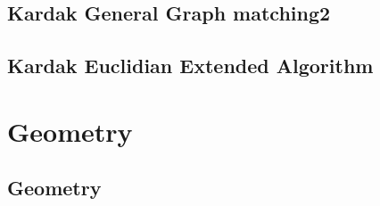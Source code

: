 \documentclass[a4paper,landscape]{article}
\begin{document}
\begin{multicols}{2}
\subsection{Kardak General Graph matching2}
	
\subsection{Kardak Euclidian Extended Algorithm}
	

\section{Geometry}
\subsection{Geometry}
	

\end{multicols}
\end{document}
